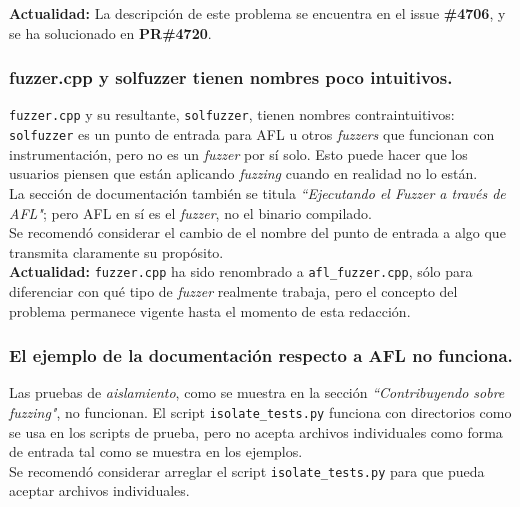 \textbf{Actualidad:} La descripción de este problema se encuentra en el issue \textbf{\#4706}\cite{GHI4706}, y se ha solucionado en \textbf{PR\#4720}\cite{GHPR4720}.\\


\subsubsection{fuzzer.cpp y solfuzzer tienen nombres poco intuitivos.}

\texttt{fuzzer.cpp} y su resultante, \texttt{solfuzzer}, tienen nombres contraintuitivos: \texttt{solfuzzer} es un punto de entrada para AFL u otros \textit{fuzzers} que funcionan con instrumentación, pero no es un \textit{fuzzer} por sí solo. Esto puede hacer que los usuarios piensen que están aplicando \textit{fuzzing} cuando en realidad no lo están.\\

La sección de documentación también se titula \textit{``Ejecutando el Fuzzer a través de AFL"}\cite{ReadTheDocsSolidityAFL}; pero AFL en sí es el \textit{fuzzer}, no el binario compilado.\\

Se recomendó considerar el cambio de el nombre del punto de entrada a algo que transmita claramente su propósito.\\

\textbf{Actualidad:} \texttt{fuzzer.cpp} ha sido renombrado a \texttt{afl\_fuzzer.cpp}, sólo para diferenciar con qué tipo de \textit{fuzzer} realmente trabaja, pero el concepto del problema permanece vigente hasta el momento de esta redacción.\\


\subsubsection{El ejemplo de la documentación respecto a AFL no funciona.}

Las pruebas de \textit{aislamiento}, como se muestra en la sección \textit{``Contribuyendo sobre fuzzing"}\cite{ReadTheDocsSolidityContributingFuzzing}, no funcionan. El script \texttt{isolate\_tests.py}\cite{GHisolatetests} funciona con directorios como se usa en los scripts de prueba, pero no acepta archivos individuales como forma de entrada tal como se muestra en los ejemplos.\\

Se recomendó considerar arreglar el script \texttt{isolate\_tests.py} para que pueda aceptar archivos individuales.\\

